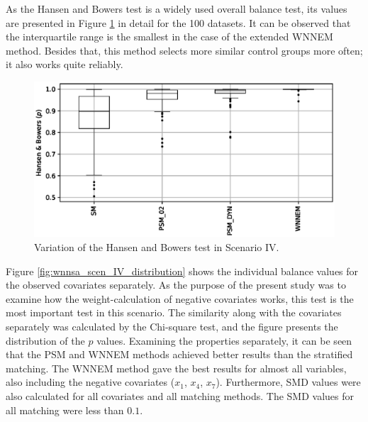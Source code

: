 		As the Hansen and Bowers test is a widely used overall balance test, its values are presented in Figure \ref{fig:wnnsa_scen_IV_hbp} in detail for the 100 datasets. It can be observed that the interquartile range is the smallest in the case of the extended WNNEM method. Besides that, this method selects more similar control groups more often; it also works quite reliably.  
										
		\begin{figure}[h!]
			\centering
			\captionsetup{justification=centering}
			\includegraphics[width=\textwidth]{assets/figures/control_group_selection/wnnsa/scenIV/hbp.eps}
			\caption{Variation of the Hansen and Bowers test in Scenario IV. %
			}
			\label{fig:wnnsa_scen_IV_hbp}    
		\end{figure}
										
		Figure \ref{fig:wnnsa_scen_IV_distribution} shows the individual balance values for the observed covariates separately. As the purpose of the present study was to examine how the weight-calculation of negative covariates works, this test is the most important test in this scenario. The similarity along with the covariates separately was calculated by the Chi-square test, and the figure presents the distribution of the $p$ values. Examining the properties separately, it can be seen that the PSM and WNNEM methods achieved better results than the stratified matching. The WNNEM method gave the best results for almost all variables, also including the negative covariates ($x_1$, $x_4$, $x_7$). Furthermore, SMD values were also calculated for all covariates and all matching methods. The SMD values for all matching were less than $0.1$.
										
